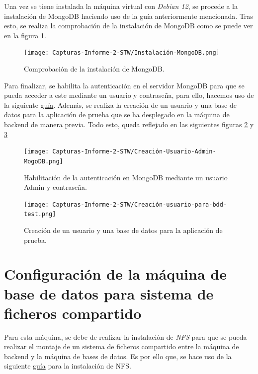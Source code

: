 \documentclass{report}
\begin{document}
  Una vez se tiene instalada la máquina virtual con \emph{Debian 12}, se procede a la instalación de MongoDB haciendo uso de la guía anteriormente mencionada. Tras esto, se realiza la comprobación de la instalación de MongoDB como se puede ver en la figura \ref{fig:Comprobación-MongoDB}.

  \begin{figure}[H]
    \centering
    \texttt{[image: Capturas-Informe-2-STW/Instalación-MongoDB.png]}
    \caption{Comprobación de la instalación de MongoDB.}
    \label{fig:Comprobación-MongoDB}
  \end{figure}

  Para finalizar, se habilita la autenticación en el servidor MongoDB para que se pueda acceder a este mediante un usuario y contraseña, para ello, hacemos uso de la siguiente \href{https://www.mongodb.com/docs/manual/tutorial/enable-authentication/}{guía}. Además, se realiza la creación de un usuario y una base de datos para la aplicación de prueba que se ha desplegado en la máquina de backend de manera previa. Todo esto, queda reflejado en las siguientes figuras \ref{fig:Habilitación-Autenticación-MongoDB} y \ref{fig:Creación-Usuario-App-MogoDB}

  \begin{figure}[H]
    \centering
    \texttt{[image: Capturas-Informe-2-STW/Creación-Usuario-Admin-MogoDB.png]}
    \caption{Habilitación de la autenticación en MongoDB mediante un usuario Admin y contraseña.}
    \label{fig:Habilitación-Autenticación-MongoDB}
  \end{figure}

  \begin{figure}[H]
    \centering
    \texttt{[image: Capturas-Informe-2-STW/Creación-usuario-para-bdd-test.png]}
    \caption{Creación de un usuario y una base de datos para la aplicación de prueba.}
    \label{fig:Creación-Usuario-App-MogoDB}
  \end{figure}

  \chapter{Configuración de la máquina de base de datos para sistema de ficheros compartido}
  Para esta máquina, se debe de realizar la instalación de \emph{NFS} para que se pueda realizar el montaje de un sistema de ficheros compartido entre la máquina de backend y la máquina de bases de datos. Es por ello que, se hace uso de la siguiente \href{https://wiki.debian.org/NFSServerSetup}{guía} para la instalación de NFS.

  
\end{document}
